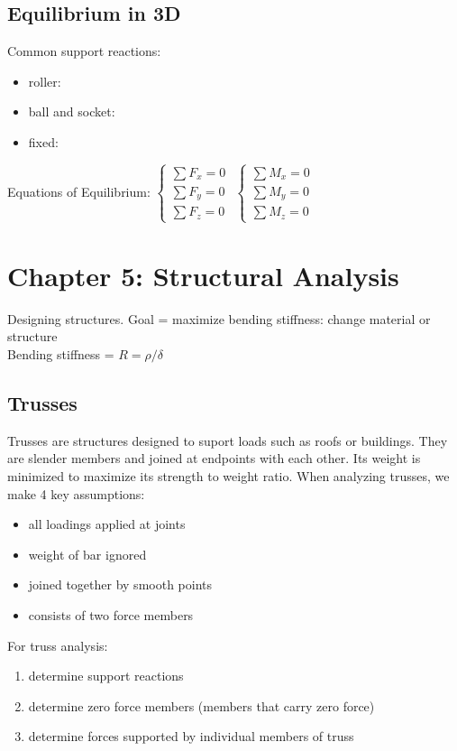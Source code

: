 \documentclass{article}
\begin{document}
    \subsection{Equilibrium in 3D}
    Common support reactions:
    \begin{itemize}
        \item roller:
        \item ball and socket:
        \item fixed:
    \end{itemize}
    Equations of Equilibrium:
    $\begin{cases}
        \sum F_x = 0 \\ \sum F_y = 0 \\ \sum F_z = 0
    \end{cases}$
    $\begin{cases}
        \sum M_x = 0 \\ \sum M_y = 0 \\ \sum M_z = 0
    \end{cases}$

    \newpage

    \section{Chapter 5: Structural Analysis}
    Designing structures. Goal = maximize bending stiffness: change material or structure\\
    Bending stiffness = $R = \rho / \delta$ 
    
    \subsection{Trusses}
    Trusses are structures designed to suport loads such as roofs or buildings. They are slender members and joined at endpoints with each other.
    Its weight is minimized to maximize its strength to weight ratio. When analyzing trusses, we make 4 key assumptions:
    \begin{itemize}
        \item all loadings applied at joints
        \item weight of bar ignored
        \item joined together by smooth points
        \item consists of two force members
    \end{itemize}
    For truss analysis:
    \begin{enumerate}
        \item determine support reactions
        \item determine zero force members (members that carry zero force)
        \item determine forces supported by individual members of truss
    \end{enumerate}
    
\end{document}
